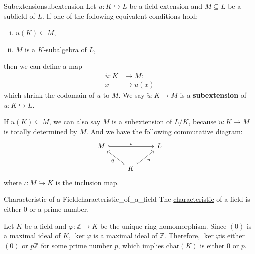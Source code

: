 \begin{definition}{Subextension}{subextension}
    Let $u:K\hookrightarrow L$ be a field extension and $M\subseteq L$ be a subfield of $L$. If one of the following equivalent conditions hold:
    \begin{enumerate}[(i)]
        \item $u(K)\subseteq M$,
        \item $M$ is a $K$-subalgebra of $L$,
    \end{enumerate}    
    then we can define a map
    \begin{align*}
        \tilde{u}:K &\longrightarrow M:\\
        x&\longmapsto u(x)
    \end{align*}
    which shrink the codomain of $u$ to $M$. We say $\tilde{u}:K \rightarrow M$ is a \textbf{subextension} of $u:K\hookrightarrow L$.
\end{definition}
\begin{remark}
    If $u(K)\subseteq M$, we can also say $M$ is a subextension of $L/K$, because $\tilde{u}:K \rightarrow M$ is totally determined by $M$. And we have the following commutative diagram:
        \[
        \begin{tikzcd}
            M \arrow[rr, "\iota", hook] &                                                    & L \\
                                        & K \arrow[lu, "\tilde{u}", hook] \arrow[ru, "u"', hook] &    
        \end{tikzcd}
        \]
    where $\iota:M\hookrightarrow K$ is the inclusion map.
\end{remark}



\begin{proposition}{Characteristic of a Field}{characteristic_of_a_field}
    The \hyperref[th:characteristic_of_a_ring]{characteristic} of a field is either $0$ or a prime number.
\end{proposition}
\begin{prf}
    Let $K$ be a field and $\varphi:\mathbb{Z}\to K$ be the unique ring homomorphism. Since $(0)$ is a maximal ideal of $K$, $\ker \varphi$ is a maximal ideal of $\mathbb{Z}$. Therefore, $\ker \varphi$is either $(0)$ or $p\mathbb{Z}$ for some prime number $p$, which implies $\mathrm{char}(K)$ is either $0$ or $p$.
\end{prf}

